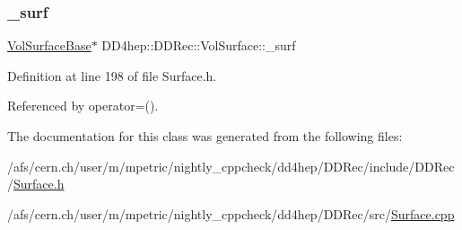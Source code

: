 \subsubsection{\texorpdfstring{\+\_\+surf}{\_surf}}
{\footnotesize\ttfamily \hyperlink{class_d_d4hep_1_1_d_d_rec_1_1_vol_surface_base}{Vol\+Surface\+Base}$\ast$ D\+D4hep\+::\+D\+D\+Rec\+::\+Vol\+Surface\+::\+\_\+surf\hspace{0.3cm}{\ttfamily [protected]}}



Definition at line 198 of file Surface.\+h.



Referenced by operator=().



The documentation for this class was generated from the following files\+:\begin{DoxyCompactItemize}
\item 
/afs/cern.\+ch/user/m/mpetric/nightly\+\_\+cppcheck/dd4hep/\+D\+D\+Rec/include/\+D\+D\+Rec/\hyperlink{_surface_8h}{Surface.\+h}\item 
/afs/cern.\+ch/user/m/mpetric/nightly\+\_\+cppcheck/dd4hep/\+D\+D\+Rec/src/\hyperlink{_surface_8cpp}{Surface.\+cpp}\end{DoxyCompactItemize}
